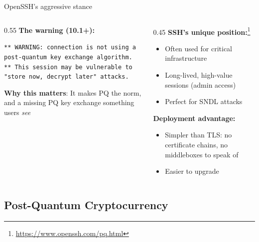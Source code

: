 \ifdefined\PRESENTATION\else\PassOptionsToClass{handout}{beamer}\fi\documentclass[aspectratio=169, lualatex]{beamer}
\begin{document}
\begin{frame}{OpenSSH's aggressive stance}
	\begin{columns}[c]
		\begin{column}{0.55\textwidth}
			\textbf{The warning (10.1+):}

			\vspace{2mm}
			{\small\texttt{** WARNING: connection is not using a post-quantum key exchange algorithm.\\
					** This session may be vulnerable to "store now, decrypt later" attacks.}}

			\vspace{3mm}
			\textbf{Why this matters}: It makes PQ the norm, and a missing PQ key exchange something users \textit{see}
		\end{column}
		\begin{column}{0.45\textwidth}
			\textbf{SSH's unique position:}\footnote{\url{https://www.openssh.com/pq.html}}
			\begin{itemize}
				\item Often used for critical infrastructure
				\item Long-lived, high-value sessions (admin access)
				\item Perfect for SNDL attacks
			\end{itemize}

			\textbf{Deployment advantage:}
			\begin{itemize}
				\item Simpler than TLS: no certificate chains, no middleboxes to speak of
				\item Easier to upgrade
			\end{itemize}
		\end{column}
	\end{columns}
\end{frame}

\subsection{Post-Quantum Cryptocurrency}
\end{document}
